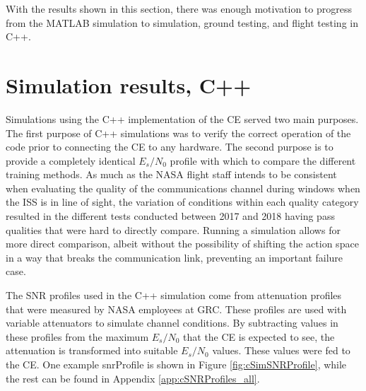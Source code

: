 \par With the results shown in this section, there was enough motivation to progress from the MATLAB simulation to simulation, ground testing, and flight testing in C++. 
\clearpage
\section{Simulation results, C++}
\par Simulations using the C++ implementation of the CE served two main purposes. The first purpose of C++ simulations was to verify the correct operation of the code prior to connecting the CE to any hardware. The second purpose is to provide a completely identical $E_s/N_0$ profile with which to compare the different training methods. As much as the NASA flight staff intends to be consistent when evaluating the quality of the communications channel during windows when the ISS is in line of sight, the variation of conditions within each quality category resulted in the different tests conducted between 2017 and 2018 having pass qualities that were hard to directly compare. Running a simulation allows for more direct comparison, albeit without the possibility of shifting the action space in a way that breaks the communication link, preventing an important failure case.
\par The SNR profiles used in the C++ simulation come from attenuation profiles that were measured by NASA employees at GRC. These profiles are used with variable attenuators to simulate channel conditions. By subtracting values in these profiles from the maximum $E_s/N_0$ that the CE is expected to see, the attenuation is transformed into suitable $E_s/N_0$ values. These values were fed to the CE. One example snrProfile is shown in Figure \ref{fig:cSimSNRProfile}, while the rest can be found in Appendix \ref{app:cSNRProfiles_all}. 

